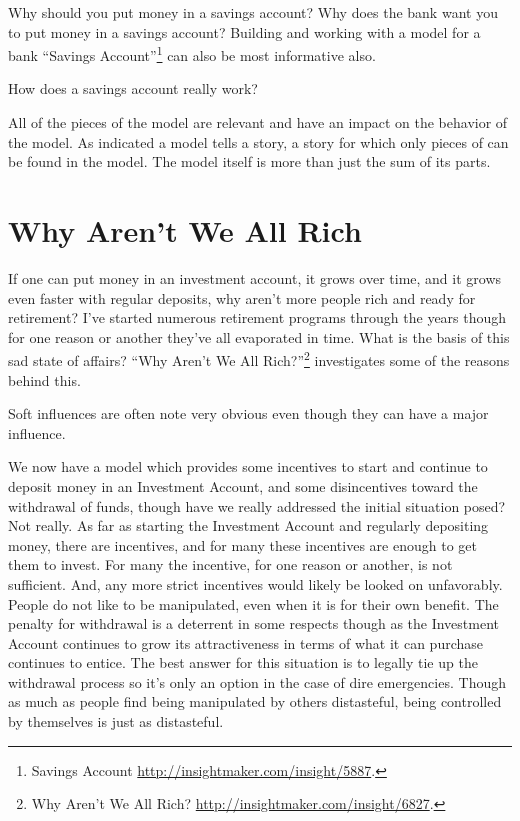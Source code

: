 \documentclass[]{memoir}
\begin{document}
Why should you put money in a savings account? Why does the bank want
you to put money in a savings account? Building and working with a model
for a bank ``Savings Account''\footnote{Savings Account
  \url{http://insightmaker.com/insight/5887}.} can also be most
informative also.

\FloatBarrier 

\begin{model}[frametitle={Model: Savings Account}] 

 How does a savings account really work?




 \end{model}

All of the pieces of the model are relevant and have an impact on the
behavior of the model. As indicated a model tells a story, a story for
which only pieces of can be found in the model. The model itself is more
than just the sum of its parts.

\section{Why Aren't We All Rich}

If one can put money in an investment account, it grows over time, and
it grows even faster with regular deposits, why aren't more people rich
and ready for retirement? I've started numerous retirement programs
through the years though for one reason or another they've all
evaporated in time. What is the basis of this sad state of affairs?
``Why Aren't We All Rich?''\footnote{Why Aren't We All Rich?
  \url{http://insightmaker.com/insight/6827}.} investigates some of the
reasons behind this.

\FloatBarrier 

\begin{model}[frametitle={Model: Why Aren't We All Rich?}] 

 Soft influences are often note very obvious even though they can have a major influence.




 \end{model}

We now have a model which provides some incentives to start and continue
to deposit money in an Investment Account, and some disincentives toward
the withdrawal of funds, though have we really addressed the initial
situation posed? Not really. As far as starting the Investment Account
and regularly depositing money, there are incentives, and for many these
incentives are enough to get them to invest. For many the incentive, for
one reason or another, is not sufficient. And, any more strict
incentives would likely be looked on unfavorably. People do not like to
be manipulated, even when it is for their own benefit. The penalty for
withdrawal is a deterrent in some respects though as the Investment
Account continues to grow its attractiveness in terms of what it can
purchase continues to entice. The best answer for this situation is to
legally tie up the withdrawal process so it's only an option in the case
of dire emergencies. Though as much as people find being manipulated by
others distasteful, being controlled by themselves is just as
distasteful.
\end{document}
